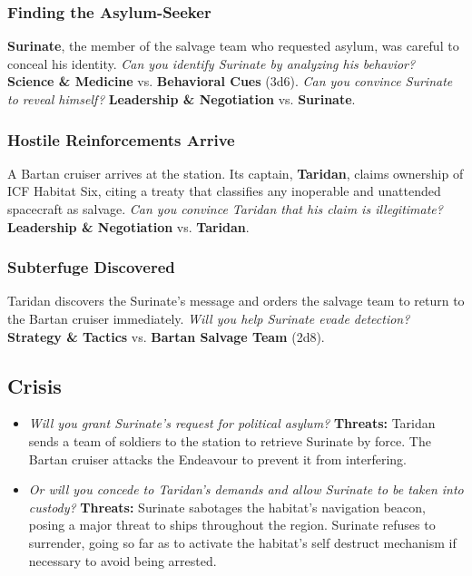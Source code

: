 \documentclass[11pt, a5paper, parskip=half-, DIV=12]{scrartcl}
\begin{document}
\subsubsection*{Finding the Asylum-Seeker}
\textbf{Surinate}, the member of the salvage team who requested asylum, was careful to conceal his identity. \textit{Can you identify Surinate by analyzing his behavior?}
\textbf{Science \& Medicine} vs. \textbf{Behavioral Cues} (3d6). \textit{Can you convince Surinate to reveal himself?} \textbf{Leadership \& Negotiation} vs. \textbf{Surinate}. 

\subsubsection*{Hostile Reinforcements Arrive}
A Bartan cruiser arrives at the station.  Its captain, \textbf{Taridan}, claims ownership of ICF Habitat Six, citing a treaty that classifies any inoperable and unattended spacecraft as salvage. \textit{Can you convince Taridan that his claim is illegitimate?} \textbf{Leadership \& Negotiation} vs. \textbf{Taridan}.

\subsubsection*{Subterfuge Discovered}
Taridan discovers the Surinate's message and orders the salvage team to return to the Bartan cruiser immediately. \textit{Will you help Surinate evade detection?} \textbf{Strategy \& Tactics} vs. \textbf{Bartan Salvage Team} (2d8).

\subsection*{Crisis}
\begin{itemize}
	\item \textit{Will you grant Surinate's request for political asylum?} \textbf{Threats:} Taridan sends a team of soldiers to the station to retrieve Surinate by force. The Bartan cruiser attacks the Endeavour to prevent it from interfering.
	\item \textit{Or will you concede to Taridan's demands and allow Surinate to be taken into custody?} \textbf{Threats:} Surinate sabotages the habitat's navigation beacon, posing a major threat to ships throughout the region. Surinate refuses to surrender, going so far as to activate the habitat's self destruct mechanism if necessary to avoid being arrested.
\end{itemize}
\end{document}
